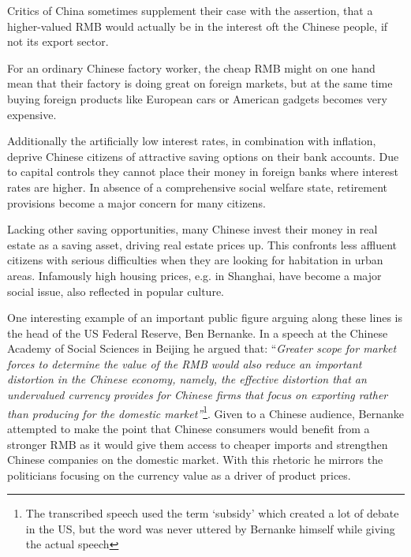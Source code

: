 Critics of China sometimes supplement their case with the assertion, that a higher-valued RMB would actually be in the interest oft the Chinese people, if not its export sector.

For an ordinary Chinese factory worker, the cheap RMB might on one hand 
mean that their factory is doing great on foreign markets, but at the 
same time buying foreign products like European cars or American gadgets 
becomes very expensive. 

Additionally the artificially low interest rates, in combination with 
inflation, deprive Chinese citizens of attractive saving options on 
their bank accounts. Due to capital controls they cannot place their 
money in foreign banks where interest rates are higher. In absence of a 
comprehensive social welfare state, retirement provisions become a major 
concern for many citizens.

Lacking other saving opportunities, many Chinese invest their money in 
real estate as a saving asset, driving real estate prices up.  This 
confronts less affluent citizens with serious difficulties when they are 
looking for habitation in urban areas.  Infamously high housing prices, 
e.g.  in Shanghai, have become a major social issue, also reflected in 
popular culture. 

One interesting example of an important public figure arguing along 
these lines is the head of the US Federal Reserve, Ben Bernanke. In a 
speech at the Chinese Academy of Social Sciences in Beijing he argued 
that: ``\textit{Greater scope for market forces to determine the value 
	of the RMB would also reduce an important distortion in the Chinese 
	economy, namely, the effective distortion that an undervalued 
	currency provides for Chinese firms that focus on exporting rather 
than producing for the domestic market''}\footnote{The transcribed 
	speech \cite{Bernanke06} used the term `subsidy' which created a lot 
	of debate in the US, but the word was never uttered by Bernanke 
himself while giving the actual speech\cite{reuters06}}. Given to a 
Chinese audience, Bernanke attempted to make the point that Chinese 
consumers would benefit from a stronger RMB as it would give them access 
to cheaper imports and strengthen Chinese companies on the domestic 
market. With this rhetoric he mirrors the politicians focusing on the 
currency value as a driver of product prices.

